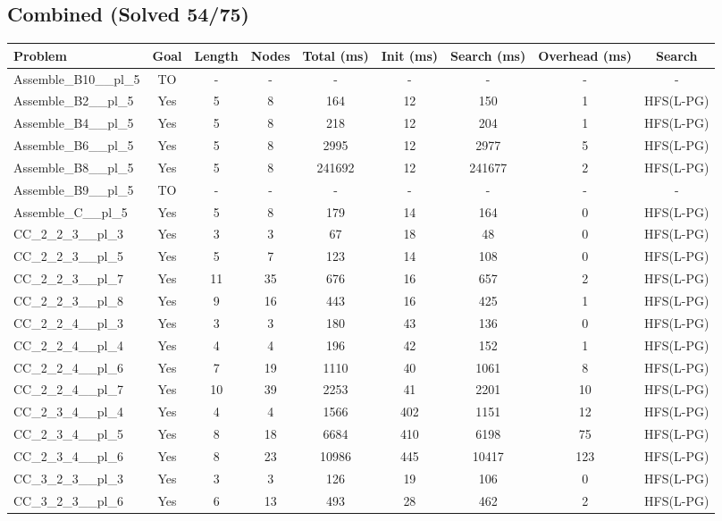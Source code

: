 \documentclass{article}
\begin{document}
\subsection*{Combined (Solved 54/75)}
\begin{tabular}{lcccccccc}
\toprule
Problem & Goal & Length & Nodes & Total (ms) & Init (ms) & Search (ms) & Overhead (ms) & Search \\
\midrule
Assemble\_B10\_\_pl\_5 & TO & - & - & - & - & - & - & - \\
Assemble\_B2\_\_pl\_5 & Yes & 5 & 8 & 164 & 12 & 150 & 1 & HFS(L-PG) \\
Assemble\_B4\_\_pl\_5 & Yes & 5 & 8 & 218 & 12 & 204 & 1 & HFS(L-PG) \\
Assemble\_B6\_\_pl\_5 & Yes & 5 & 8 & 2995 & 12 & 2977 & 5 & HFS(L-PG) \\
Assemble\_B8\_\_pl\_5 & Yes & 5 & 8 & 241692 & 12 & 241677 & 2 & HFS(L-PG) \\
Assemble\_B9\_\_pl\_5 & TO & - & - & - & - & - & - & - \\
Assemble\_C\_\_pl\_5 & Yes & 5 & 8 & 179 & 14 & 164 & 0 & HFS(L-PG) \\
CC\_2\_2\_3\_\_pl\_3 & Yes & 3 & 3 & 67 & 18 & 48 & 0 & HFS(L-PG) \\
CC\_2\_2\_3\_\_pl\_5 & Yes & 5 & 7 & 123 & 14 & 108 & 0 & HFS(L-PG) \\
CC\_2\_2\_3\_\_pl\_7 & Yes & 11 & 35 & 676 & 16 & 657 & 2 & HFS(L-PG) \\
CC\_2\_2\_3\_\_pl\_8 & Yes & 9 & 16 & 443 & 16 & 425 & 1 & HFS(L-PG) \\
CC\_2\_2\_4\_\_pl\_3 & Yes & 3 & 3 & 180 & 43 & 136 & 0 & HFS(L-PG) \\
CC\_2\_2\_4\_\_pl\_4 & Yes & 4 & 4 & 196 & 42 & 152 & 1 & HFS(L-PG) \\
CC\_2\_2\_4\_\_pl\_6 & Yes & 7 & 19 & 1110 & 40 & 1061 & 8 & HFS(L-PG) \\
CC\_2\_2\_4\_\_pl\_7 & Yes & 10 & 39 & 2253 & 41 & 2201 & 10 & HFS(L-PG) \\
CC\_2\_3\_4\_\_pl\_4 & Yes & 4 & 4 & 1566 & 402 & 1151 & 12 & HFS(L-PG) \\
CC\_2\_3\_4\_\_pl\_5 & Yes & 8 & 18 & 6684 & 410 & 6198 & 75 & HFS(L-PG) \\
CC\_2\_3\_4\_\_pl\_6 & Yes & 8 & 23 & 10986 & 445 & 10417 & 123 & HFS(L-PG) \\
CC\_3\_2\_3\_\_pl\_3 & Yes & 3 & 3 & 126 & 19 & 106 & 0 & HFS(L-PG) \\
CC\_3\_2\_3\_\_pl\_6 & Yes & 6 & 13 & 493 & 28 & 462 & 2 & HFS(L-PG) \\

\end{tabular}
\end{document}
